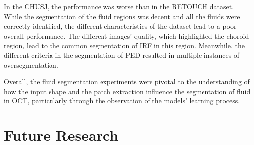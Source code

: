 \par
In the CHUSJ, the performance was worse than in the RETOUCH dataset. While the segmentation of the fluid regions was decent and all the fluids were correctly identified, the different characteristics of the dataset lead to a poor overall performance. The different images' quality, which highlighted the choroid region, lead to the common segmentation of IRF in this region. Meanwhile, the different criteria in the segmentation of PED resulted in multiple instances of oversegmentation.
\par
Overall, the fluid segmentation experiments were pivotal to the understanding of how the input shape and the patch extraction influence the segmentation of fluid in OCT, particularly through the observation of the models' learning process. 

\section{Future Research}